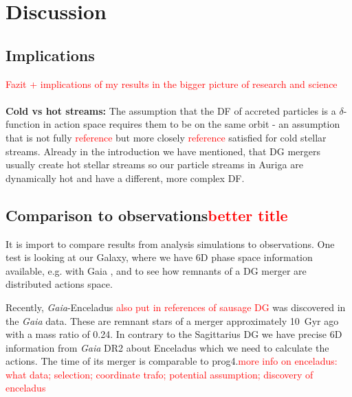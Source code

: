 \section{Discussion} \label{sec:Discussion}
\subsection{Implications}
\textcolor{red}{Fazit + implications of my results in the bigger picture of research and science}
\\\\\textbf{Cold vs hot streams:}
The assumption that the \ac{DF} of accreted particles is a $\delta$-function in action space requires them to be on the same orbit - an assumption that is not fully \textcolor{red}{reference} but more closely \textcolor{red}{reference} satisfied for cold stellar streams. Already in the introduction we have mentioned, that \ac{DG} mergers usually create hot stellar streams so our particle streams in Auriga are dynamically hot and have a different, more complex \ac{DF}.

\subsection{Comparison to observations\textcolor{red}{better title}}
It is import to compare results from analysis simulations to observations. One test is looking at our Galaxy, where we have 6D phase space information available, e.g. with Gaia \citep{Gaia...mission...2016, GaiaDR2...overview...2018}, and to see how remnants of a \ac{DG} merger are distributed actions space.

Recently, \textit{Gaia}-Enceladus \citep{Enceladus....Helmi...2018} \textcolor{red}{also put in references of sausage DG} was discovered in the \textit{Gaia} data. These are remnant stars of a merger approximately \SI{10}{Gyr} ago with a mass ratio of 0.24. In contrary to the Sagittarius \ac{DG} we have precise 6D information from \textit{Gaia} DR2 about Enceladus which we need to calculate the actions. The time of its merger is comparable to prog4.\textcolor{red}{more info on enceladus: what data; selection; coordinate trafo; potential assumption; discovery of enceladus}

